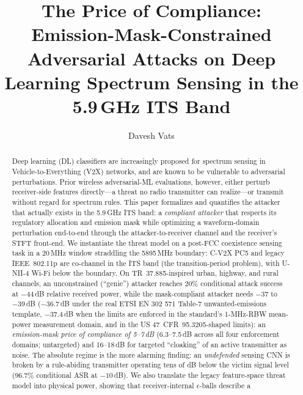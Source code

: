 \documentclass[review]{elsarticle}
\begin{document}
\begin{frontmatter}

\title{The Price of Compliance: Emission-Mask-Constrained Adversarial Attacks
on Deep Learning Spectrum Sensing in the 5.9\,GHz ITS Band}

\author[inst1]{Davesh Vats}


\begin{abstract}
Deep learning (DL) classifiers are increasingly proposed for spectrum sensing
in Vehicle-to-Everything (V2X) networks, and are known to be vulnerable to
adversarial perturbations. Prior wireless adversarial-ML evaluations, however,
either perturb receiver-side features directly---a threat no radio transmitter
can realize---or transmit without regard for spectrum rules. This paper
formalizes and quantifies the attacker that actually exists in the 5.9\,GHz ITS
band: a \emph{compliant attacker} that respects its regulatory allocation and
emission mask while optimizing a waveform-domain perturbation end-to-end
through the attacker-to-receiver channel and the receiver's STFT front-end. We
instantiate the threat model on a post-FCC coexistence sensing task in a
20\,MHz window straddling the 5895\,MHz boundary: C-V2X PC5 and legacy
IEEE~802.11p are co-channel in the ITS band (the transition-period problem),
with U-NII-4 Wi-Fi below the boundary. On TR~37.885-inspired urban, highway,
and rural channels, an unconstrained (``genie'') attacker reaches 20\% conditional attack
success at $-44$\,dB relative received power, while the mask-compliant attacker
needs $-37$ to $-39$\,dB ($-36.7$\,dB under the real ETSI EN 302 571
Table-7 unwanted-emissions template, $-37.4$\,dB when the limits are
enforced in the standard's 1-MHz-RBW mean-power measurement domain, and
in the US 47~CFR~95.3205-shaped limits): an \emph{emission-mask price of
compliance of 5--7\,dB} (6.3--7.5\,dB across all four enforcement
domains; untargeted) and 16--18\,dB for targeted ``cloaking'' of an
active transmitter as noise. The absolute regime is the more alarming finding: an
\emph{undefended} sensing CNN is broken by a rule-abiding transmitter operating
tens of dB below the victim signal level (96.7\% conditional ASR at
$-10$\,dB). We also translate the legacy feature-space threat model into
physical power, showing that receiver-internal $\epsilon$-balls describe a

\end{abstract}
\end{frontmatter}
\end{document}
